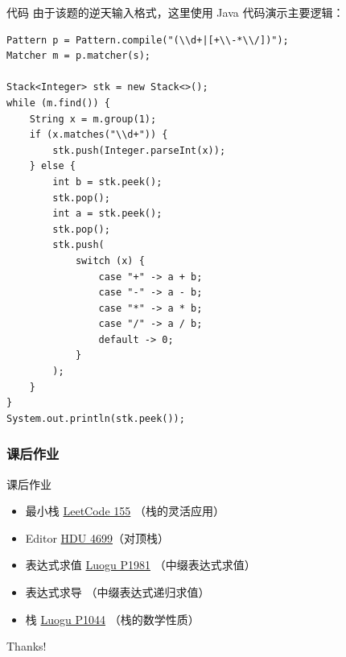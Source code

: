 \documentclass{beamer}
\begin{document}
\begin{frame}[fragile]{代码}
    由于该题的逆天输入格式，这里使用 Java 代码演示主要逻辑：

    \begin{verbatim}
Pattern p = Pattern.compile("(\\d+|[+\\-*\\/])");
Matcher m = p.matcher(s);

Stack<Integer> stk = new Stack<>();
while (m.find()) {
    String x = m.group(1);
    if (x.matches("\\d+")) {
        stk.push(Integer.parseInt(x));
    } else {
        int b = stk.peek();
        stk.pop();
        int a = stk.peek();
        stk.pop();
        stk.push(
            switch (x) {
                case "+" -> a + b;
                case "-" -> a - b;
                case "*" -> a * b;
                case "/" -> a / b;
                default -> 0;
            }
        );
    }
}
System.out.println(stk.peek());
    \end{verbatim}
\end{frame}

\subsubsection{课后作业}
\begin{frame}{课后作业}
    \begin{itemize}
        \item 最小栈 \href{https://leetcode.cn/problems/min-stack/}{LeetCode 155} （栈的灵活应用）
        \item Editor \href{https://acm.hdu.edu.cn/showproblem.php?pid=4699}{HDU 4699}（对顶栈）
        \item {} 表达式求值 \href{https://www.luogu.com.cn/problem/P1981}{Luogu P1981} （中缀表达式求值）
        \item {} 表达式求导 （中缀表达式递归求值）
        \item {} 栈 \href{https://www.luogu.com.cn/problem/P1044}{Luogu P1044} （栈的数学性质）
    \end{itemize}
\end{frame}

\begin{frame}
    \begin{center}
        {\Huge\calligra Thanks!}
    \end{center}
\end{frame}
\end{document}
